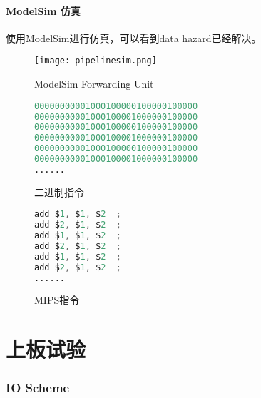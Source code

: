 \documentclass[a4paper]{article}
\begin{document}
    \subsection{ModelSim 仿真}使用ModelSim进行仿真，可以看到data hazard已经解决。
\begin{figure}[h]
  \centering
  \texttt{[image: pipelinesim.png]}
  \caption{ModelSim Forwarding Unit}
\end{figure}
        \begin{figure}[h]
        \begin{minipage}[t]{0.54\linewidth}
        \centering
            \begin{lstlisting}[language={Verilog}]
00000000001000100000100000100000
00000000001000100001000000100000
00000000001000100000100000100000
00000000001000100001000000100000
00000000001000100000100000100000
00000000001000100001000000100000
......  \end{lstlisting}
        \caption{二进制指令}
        \end{minipage}%
        \begin{minipage}[t]{0.46\linewidth}
        \centering
            \begin{lstlisting}[language={Verilog}]
add $1, $1, $2  ;
add $2, $1, $2  ;
add $1, $1, $2  ;
add $2, $1, $2  ;
add $1, $1, $2  ;
add $2, $1, $2  ;
......   \end{lstlisting}
        \caption{MIPS指令}
        \end{minipage}
    \end{figure}
\newline
\newline
\newline
\newline
\newline
\newline
\newline
\newline
\newline
\newline
\newline
\part{上板试验}
\section{IO Scheme}
\end{document}
